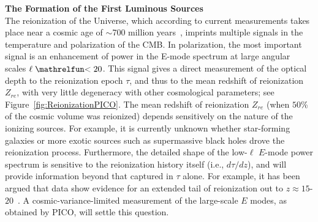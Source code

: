 \documentclass[PICOReport.tex]{subfiles}
\begin{document}

{\bf The Formation of the First Luminous Sources}\\
The reionization of the Universe, which according to current measurements takes place near a cosmic age of $\sim$700 million 
years~\citep{planckreion}, imprints multiple signals in the temperature and polarization of the CMB.  In polarization, the most 
important signal is an enhancement of power in the E-mode spectrum at large angular scales $\ell \simlt 20$. 
This signal gives a direct measurement of the optical depth to the reionization epoch $\tau$, and thus to the 
mean redshift of reionization $Z_{re}$, with very little degeneracy with other cosmological parameters; see Figure~\ref{fig:ReionizationPICO}. 
The mean redshift of reionization $Z_{re}$ (when $50$\% of the cosmic volume was reionized) depends sensitively 
on the nature of the ionizing sources.  For example, it is currently unknown whether star-forming galaxies or more exotic 
sources such as supermassive black holes drove the reionization process.  
Furthermore, the detailed shape of the low-$\ell$ $E$-mode power spectrum is sensitive to the reionization history 
itself (i.e., $d\tau/dz$), and will provide information beyond that captured in $\tau$ alone.  For example, it has been 
argued that \planck data show evidence for an extended tail of reionization out to $z \approx 15$-$20$~\cite{Miranda2017}.  
A cosmic-variance-limited measurement of the large-scale $E$ modes, as obtained by PICO, will settle this question.  
 
\end{document}
